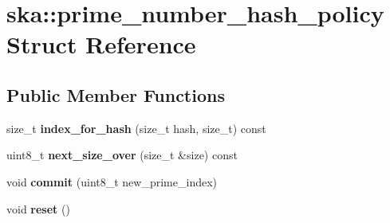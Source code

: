 \section{ska\+:\+:prime\+\_\+number\+\_\+hash\+\_\+policy Struct Reference}
\label{structska_1_1prime__number__hash__policy}
\subsection*{Public Member Functions}
\begin{DoxyCompactItemize}
\item 
size\+\_\+t {\bfseries index\+\_\+for\+\_\+hash} (size\+\_\+t hash, size\+\_\+t) const \label{structska_1_1prime__number__hash__policy_a474304979d54425a2530a5a11321881b}

\item 
uint8\+\_\+t {\bfseries next\+\_\+size\+\_\+over} (size\+\_\+t \&size) const \label{structska_1_1prime__number__hash__policy_a2677e5405639125b7c27cd412555b7ea}

\item 
void {\bfseries commit} (uint8\+\_\+t new\+\_\+prime\+\_\+index)\label{structska_1_1prime__number__hash__policy_a8b3a847f42f0ee4c5acbdf5c7acd1598}

\item 
void {\bfseries reset} ()\label{structska_1_1prime__number__hash__policy_ae70c41a3db310936504c0a3eb07c4395}

\end{DoxyCompactItemize}
